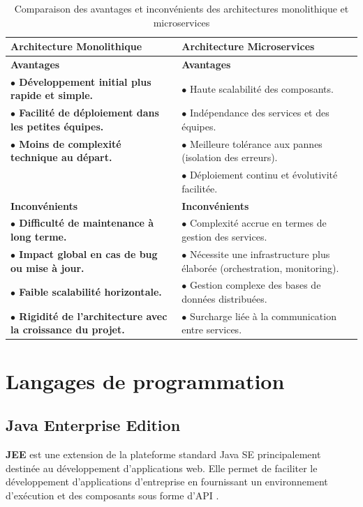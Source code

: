 \begin{table}[H]
\centering
{}
\renewcommand{\arraystretch}{1.5}
\begin{tabular}{|>{\bfseries}m{5.5cm}|m{8cm}|}
\hline
\rowcolor{blue!20}
\textbf{Architecture Monolithique} & \textbf{Architecture Microservices} \\
\hline
\textbf{Avantages} & \textbf{Avantages} \\
\hline
$\bullet$ Développement initial plus rapide et simple. & $\bullet$ Haute scalabilité des composants. \\
$\bullet$ Facilité de déploiement dans les petites équipes. & $\bullet$ Indépendance des services et des équipes. \\
$\bullet$ Moins de complexité technique au départ. & $\bullet$ Meilleure tolérance aux pannes (isolation des erreurs). \\
 & $\bullet$ Déploiement continu et évolutivité facilitée. \\
\hline
\textbf{Inconvénients} & \textbf{Inconvénients} \\
\hline
$\bullet$ Difficulté de maintenance à long terme. & $\bullet$ Complexité accrue en termes de gestion des services. \\
$\bullet$ Impact global en cas de bug ou mise à jour. & $\bullet$ Nécessite une infrastructure plus élaborée (orchestration, monitoring). \\
$\bullet$ Faible scalabilité horizontale. & $\bullet$ Gestion complexe des bases de données distribuées. \\
$\bullet$ Rigidité de l'architecture avec la croissance du projet. & $\bullet$ Surcharge liée à la communication entre services. \\
\hline
\end{tabular}
\caption{Comparaison des avantages et inconvénients des architectures monolithique et microservices \cite{martin-fowler-microservices}}
\label{tab:comparaison_architectures}
\end{table}

\section{Langages de programmation}
\subsection{Java Enterprise Edition}
\textbf{JEE} est une extension de la plateforme standard Java SE principalement destinée au développement d'applications web. Elle permet de faciliter le développement d'applications d'entreprise en fournissant un environnement d'exécution et des composants sous forme d'API \cite{jee}.

